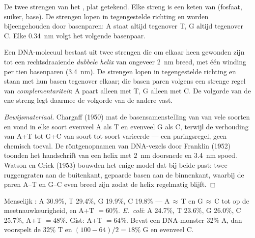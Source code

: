 \begin{omfigure}
{\small De twee strengen van het , plat getekend. Elke streng is een
keten van  (fosfaat, suiker, base). De strengen lopen in
tegengestelde richting en worden bijeengehouden door basenparen: A staat
altijd tegenover T, G altijd tegenover C. Elke \qty{0.34}{nm} volgt het
volgende basenpaar.}
\end{omfigure}

\begin{proposition}\label{prop:g10:universal-dna:helix}
Een DNA-molecuul bestaat uit twee strengen die om elkaar heen gewonden
zijn tot een rechtsdraaiende \emph{dubbele helix}
van ongeveer \qty{2}{nm} breed, met één winding per tien basenparen
(\qty{3.4}{nm}). De strengen lopen in tegengestelde richting en staan
met hun basen tegenover elkaar; die basen paren volgens een strenge
regel van \emph{complementariteit}: A paart
alleen met T, G alleen met C. De volgorde van de ene streng legt daarmee
de volgorde van de andere vast.
\end{proposition}
\begin{proof}[Bewijsmateriaal]
Chargaff (1950) mat de basensamenstelling van  van vele soorten en
vond in elke soort evenveel A als T en evenveel G als C, terwijl de
verhouding van A+T tot G+C van soort tot soort varieerde --- een
paringsregel, geen chemisch toeval. De röntgenopnamen van DNA-vezels
door Franklin (1952) toonden het handschrift van een helix met
\qty{2}{nm} doorsnede en \qty{3.4}{nm} spoed. Watson en Crick (1953)
bouwden het enige model dat bij beide past: twee ruggengraten aan de
buitenkant, gepaarde basen aan de binnenkant, waarbij de paren A--T en
G--C even breed zijn zodat de helix regelmatig blijft.
\end{proof}

\begin{example}\label{ex:g10:universal-dna:chargaff}
Menselijk : A 30.9\%, T 29.4\%, G 19.9\%, C 19.8\% --- A$\,\approx\,$T
en G$\,\approx\,$C tot op de meetnauwkeurigheid, en A+T $= 60\%$.
\emph{E.~coli}: A 24.7\%, T 23.6\%, G 26.0\%, C 25.7\%, A+T $= 48\%$.
Gist: A+T $= 64\%$. Bevat een DNA-monster 32\% A, dan voorspelt de
 32\% T en $(100 - 64)/2 = 18\%$ G en evenveel C.
\end{example}

